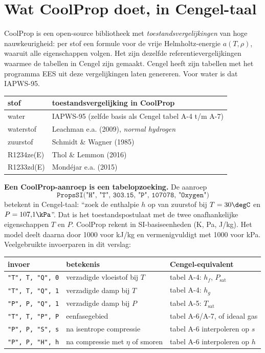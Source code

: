 \section{Wat CoolProp doet, in Cengel-taal}
\label{s:coolprop}
CoolProp is een open-source bibliotheek met \emph{toestandsvergelijkingen} van hoge nauwkeurigheid: per stof een
formule voor de vrije Helmholtz-energie $a(T,\rho)$, waaruit alle eigenschappen volgen. Het zijn dezelfde
referentievergelijkingen waarmee de tabellen in Cengel zijn gemaakt. Cengel heeft zijn tabellen met het programma
EES uit deze vergelijkingen laten genereren. Voor water is dat IAPWS-95.
\begin{center}
\begin{tabularx}{\textwidth}{lX}
\toprule
stof & toestandsvergelijking in CoolProp\\
\midrule
water & IAPWS-95 (zelfde basis als Cengel tabel A-4 t/m A-7)\\
waterstof & Leachman e.a. (2009), \emph{normal hydrogen}\\
zuurstof & Schmidt \& Wagner (1985)\\
R1234ze(E) & Thol \& Lemmon (2016)\\
R1233zd(E) & Mondéjar e.a. (2015)\\
\bottomrule
\end{tabularx}
\end{center}
\textbf{Een CoolProp-aanroep is een tabelopzoeking.} De aanroep
\[
\texttt{PropsSI("H", "T", 303.15, "P", 107078, "Oxygen")}
\]
betekent in Cengel-taal: ``zoek de enthalpie $h$ op van zuurstof bij $T = 30\degC$ en $P = 107{,}1\kPa$''. Dat is het
toestandspostulaat met de twee onafhankelijke eigenschappen $T$ en $P$. CoolProp rekent in SI-basiseenheden
(K, Pa, J/kg). Het model deelt daarna door 1000 voor kJ/kg en vermenigvuldigt met 1000 voor kPa.
Veelgebruikte invoerparen in dit verslag:
\begin{center}
\begin{tabular}{lll}
\toprule
invoer & betekenis & Cengel-equivalent\\
\midrule
\texttt{"T", T, "Q", 0} & verzadigde vloeistof bij $T$ & tabel A-4: $h_f$, $P_\mathrm{sat}$\\
\texttt{"T", T, "Q", 1} & verzadigde damp bij $T$ & tabel A-4: $h_g$\\
\texttt{"P", P, "Q", 1} & verzadigde damp bij $P$ & tabel A-5: $T_\mathrm{sat}$\\
\texttt{"T", T, "P", P} & eenfasegebied & tabel A-6/A-7, of ideaal gas\\
\texttt{"P", P, "S", s} & na isentrope compressie & tabel A-6 interpoleren op $s$\\
\texttt{"P", P, "H", h} & na compressie met $\eta$ of smoren & tabel A-6 interpoleren op $h$\\
\bottomrule
\end{tabular}
\end{center}
